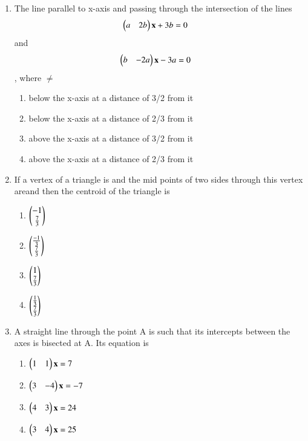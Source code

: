 \begin{enumerate}
\begin{enumerate}
     \end{enumerate}
    \item The line parallel to x-axis and passing through the intersection of the lines \begin{align}\begin{pmatrix}a & 2b\end{pmatrix} \mathbf {x} + 3b &= 0\end{align} and \begin{align}\begin{pmatrix}b & -2a\end{pmatrix} \mathbf {x} - 3a &= 0\end{align} , where $\neq$
    \begin{enumerate}
     \item  below the x-axis at a distance of 3/2 from it
     \item  below the x-axis at a distance of 2/3 from it
     \item  above the x-axis at a distance of 3/2 from it
     \item  above the x-axis at a distance of 2/3 from it
     \end{enumerate}
    \item If a vertex of a triangle is and the mid points of two sides through this vertex areand  then the centroid of the triangle is
    \begin{enumerate}
     \item  $\begin{pmatrix}-1\\ \frac{7}{3}\end{pmatrix}$ 
     \item $\begin{pmatrix}\frac{-1}{3}\\\frac{7}{3}\end{pmatrix}$
     \item  $\begin{pmatrix}1\\ \frac{7}{3}\end{pmatrix}$
     \item  $\begin{pmatrix}\frac{1}{3}\\\frac{7}{3}\end{pmatrix}$
     \end{enumerate}
    \item A straight line through the point A is such that its intercepts between the axes is bisected at A. Its equation is
    \begin{enumerate}
     \item $\begin{pmatrix}1 & 1\end{pmatrix} \mathbf {x} = 7$
     \item  $\begin{pmatrix}3 & -4\end{pmatrix} \mathbf {x} = -7$
     \item  $\begin{pmatrix}4 & 3\end{pmatrix} \mathbf {x} = 24$
     \item  $\begin{pmatrix}3 & 4\end{pmatrix} \mathbf {x} = 25$

\end{enumerate}
\end{enumerate}
